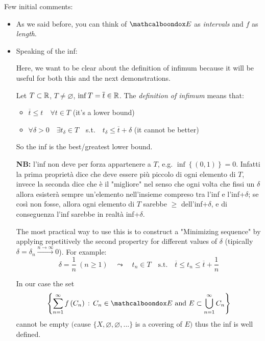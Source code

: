 Few initial comments:
\begin{itemize}
    \item As we said before, you can think of $\bondox{E}$ as \emph{intervals} and $f$ as \emph{length}.

    \item Speaking of the inf:
    \begin{marker}
    Here, we want to be clear about the definition of infimum because it will be useful for both this and the next demonstrations.

    \bigskip

    Let $T\subset\mathbb{R}$, $T\neq\varnothing$, $\inf T=\overline{t}\in\mathbb{R}$. The \emph{definition of infimum} means that:
    \begin{itemize}[$\triangleright$]
        \item $\overline{t}\leq t\quad\forall t\in T$ (it's a lower bound)
        \item $\forall\delta>0\quad \exists t_\delta\in T\quad$s.t.$\quad t_\delta\leq \overline{t}+\delta$ (it cannot be better)
    \end{itemize}
    So the inf is the best/greatest lower bound.

    \bigskip

    \textbf{NB:} l'inf non deve per forza appartenere a $T$, e.g. $\inf\left\{ (0,1) \right\}=0$. Infatti la prima proprietà dice che deve essere più piccolo di ogni elemento di $T$, invece la seconda dice che è il "migliore" nel senso che ogni volta che fissi un $\delta$ allora esisterà sempre un'elemento nell'insieme compreso tra l'inf e l'inf+$\delta$; se così non fosse, allora ogni elemento di $T$ sarebbe $\geq$ dell'inf+$\delta$, e di conseguenza l'inf sarebbe in realtà inf+$\delta$.

    \bigskip

    The most practical way to use this is to construct a "Minimizing sequence" by applying repetitively the second propertry for different values of $\delta$ (tipically $\delta=\delta_n\xrightarrow{n\to\infty}0$). For example:
    \begin{equation*}
    \delta=\frac{1}{n}\ (n\geq 1)\quad\leadsto\quad t_n\in T\quad\text{s.t.}\quad \overline{t}\leq t_n\leq \overline{t}+\frac{1}{n} 
    \end{equation*}
    \end{marker}

    In our case the set
    \begin{equation*}
    \left\{\sum^{\infty}_{n=1}f\left( C_n \right)\,:\,C_n\in\bondox{E}\text{ and }E\subset\bigcup_{n=1}^{\infty}C_n \right\}
    \end{equation*}
    cannot be empty $\big($cause $\{X,\varnothing,\varnothing,...\}$ is a covering of $E$$\big)$ thus the inf is well defined.
\end{itemize}

